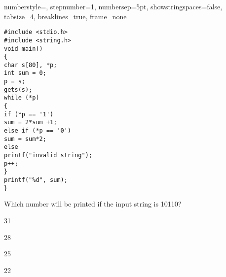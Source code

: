 \documentclass[journal,,12pt,onecolumn]{IEEEtran}
\theoremstyle{remark}
\begin{document}
\begin{enumerate}
{        %
        numberstyle=\tiny,
        stepnumber=1,
        numbersep=5pt,
        showstringspaces=false,
        tabsize=4,
        breaklines=true,
        frame=none}  %
\begin{lstlisting}
#include <stdio.h>
#include <string.h>
void main()
{
char s[80], *p;
int sum = 0;
p = s;
gets(s);
while (*p)
{
if (*p == '1')
sum = 2*sum +1;
else if (*p == '0')
sum = sum*2;
else
printf("invalid string");
p++;
}
printf("%d", sum);
}
\end{lstlisting}
Which number will be printed if the input string is 10110?
\begin{enumerate}
    \begin{multicols}{4}
        \item 31
        \item 28
        \item 25
        \item 22
    \end{multicols}
\end{enumerate}
\bigskip

\end{enumerate}
\end{document}
